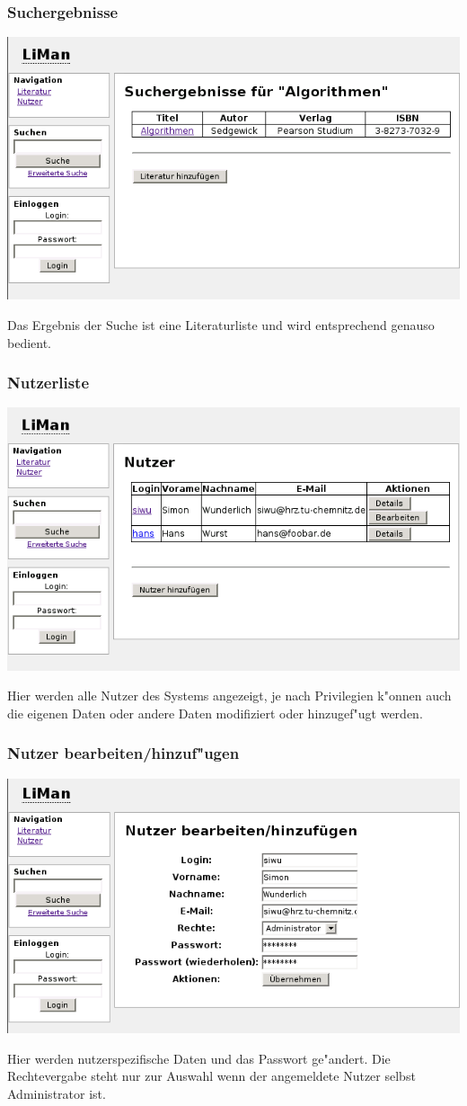 \subsubsection{Suchergebnisse}
\includegraphics[scale=0.6]{search.png}

Das Ergebnis der Suche ist eine Literaturliste und wird entsprechend genauso bedient.

\subsubsection{Nutzerliste}
\includegraphics[scale=0.6]{user.png}

Hier werden alle Nutzer des Systems angezeigt, je nach Privilegien k"onnen auch die eigenen Daten oder andere
Daten modifiziert oder hinzugef"ugt werden.

\subsubsection{Nutzer bearbeiten/hinzuf"ugen}
\includegraphics[scale=0.6]{usermod.png}

Hier werden nutzerspezifische Daten und das Passwort ge"andert. Die Rechtevergabe steht nur zur Auswahl wenn
der angemeldete Nutzer selbst Administrator ist.
